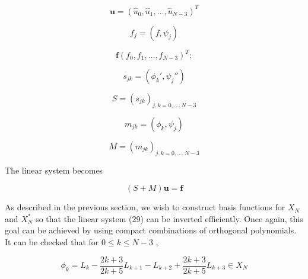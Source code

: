 \[
	\mathbf{ u } = \left( \widehat{ u }_{ 0 }, \widehat{ u }_{ 1 }, \ldots, \widehat{ u }_{ N-3 } \right)^{ T }
\]

\[
	f_{ j } = \left( f, \psi_{ j } \right)
\]

\[
	\mathbf{ f } \left( f_{ 0 }, f_{ 1 }, \ldots, f_{ N-3 } \right)^{ T };
\]

\[
	s_{ jk } = \left( \phi_{ k }', \psi_{ j }'' \right)
\]

\[
	S = \left( s_{ jk } \right)_{ j,k=0,\ldots , N-3 }
\]

\[
	m_{ jk } = \left( \phi_{ k }, \psi_{ j } \right)
\]

\[
	M = \left( m_{ jk } \right)_{ j,k=0,\ldots,N-3 }
\]

The linear system becomes

\begin{equation}
	(S+M) \mathbf{ u } = \mathbf{ f }
\end{equation}

As described in the previous section, we wish to construct basis functions for $ X_{ N } $ and $ X_{ N }^{ * } $ so that the linear system (29) can be inverted efficiently. Once again, this goal can be achieved by using compact combinations of orthogonal polynomials. It can be checked that for $ 0 \leq k \leq N-3 $ ,  

\[
	\phi_{ k } =L_{ k } - \frac{2k+3}{2k+5} L_{ k+1 } - L_{ k+2 } + \frac{2k+3}{2k+5} L_{ k+3 } \in X_{ N }
\]
